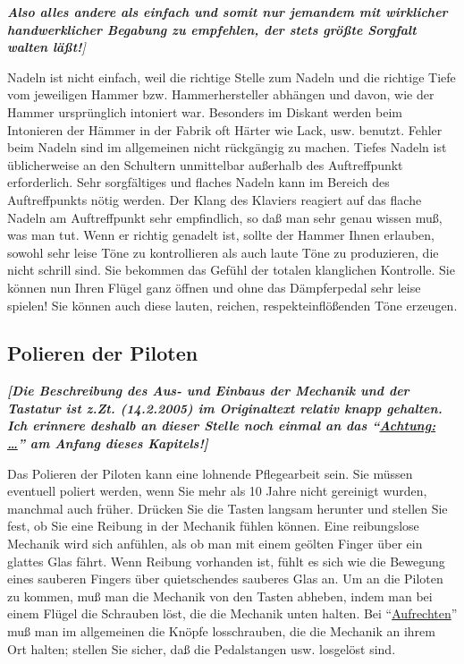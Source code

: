 \textit{\textbf{Also alles andere als einfach und somit nur jemandem mit wirklicher handwerklicher Begabung zu empfehlen, der stets größte Sorgfalt walten läßt!}]}

Nadeln ist nicht einfach, weil die richtige Stelle zum Nadeln und die richtige Tiefe vom jeweiligen Hammer bzw. Hammerhersteller abhängen und davon, wie der Hammer ursprünglich intoniert war.
 Besonders im Diskant werden beim Intonieren der Hämmer in der Fabrik oft Härter wie Lack, usw. benutzt.
 Fehler beim Nadeln sind im allgemeinen nicht rückgängig zu machen.
 Tiefes Nadeln ist üblicherweise an den Schultern unmittelbar außerhalb des Auftreffpunkt erforderlich.
 Sehr sorgfältiges und flaches Nadeln kann im Bereich des Auftreffpunkts nötig werden.
 Der Klang des Klaviers reagiert auf das flache Nadeln am Auftreffpunkt sehr empfindlich, so daß man sehr genau wissen muß, was man tut.
 Wenn er richtig genadelt ist, sollte der Hammer Ihnen erlauben, sowohl sehr leise Töne zu kontrollieren als auch laute Töne zu produzieren, die nicht schrill sind.
 Sie bekommen das Gefühl der totalen klanglichen Kontrolle.
 Sie können nun Ihren Flügel ganz öffnen und ohne das Dämpferpedal sehr leise spielen!
 Sie können auch diese lauten, reichen, respekteinflößenden Töne erzeugen.
 \hypertarget{c2_7b}{}\hypertarget{c2_7_pilo}{}

\subsection{Polieren der Piloten}

\textbf{\textit{{\normalsize [Die Beschreibung des  Aus- und Einbaus der Mechanik und der Tastatur ist z.Zt. (14.2.2005) im Originaltext relativ knapp gehalten.
 Ich erinnere deshalb an dieser Stelle noch einmal an das \enquote{\hyperlink{c2_1}{Achtung: \ldots}} am Anfang dieses Kapitels!]}}}

Das Polieren der Piloten kann eine lohnende Pflegearbeit sein.
 Sie müssen eventuell poliert werden, wenn Sie mehr als 10 Jahre nicht gereinigt wurden, manchmal auch früher.
 Drücken Sie die Tasten langsam herunter und stellen Sie fest, ob Sie eine Reibung in der Mechanik fühlen können.
 Eine reibungslose Mechanik wird sich anfühlen, als ob man mit einem geölten Finger über ein glattes Glas fährt.
 Wenn Reibung vorhanden ist, fühlt es sich wie die Bewegung eines sauberen Fingers über quietschendes sauberes Glas an.
 Um an die Piloten zu kommen, muß man die Mechanik von den Tasten abheben, indem man bei einem Flügel die Schrauben löst, die die Mechanik unten halten.
 Bei \enquote{\hyperlink{upright}{Aufrechten}} muß man im allgemeinen die Knöpfe losschrauben, die die Mechanik an ihrem Ort halten; stellen Sie sicher, daß die Pedalstangen usw. losgelöst sind.
 

